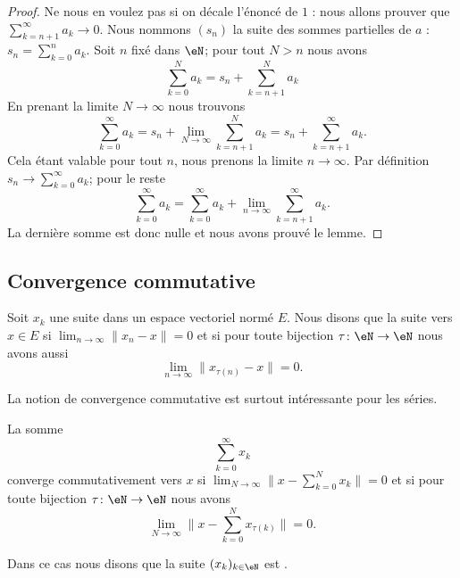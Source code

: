 \begin{proof}
	Ne nous en voulez pas si on décale l'énoncé de \( 1\) : nous allons prouver que \( \sum_{k=n+1}^{\infty}a_k\to 0\). Nous nommons \( (s_n)\) la suite des sommes partielles de \( a\) : \( s_n=\sum_{k=0}^na_k\). Soit \( n\) fixé dans \( \eN\); pour tout \( N>n\) nous avons
	\begin{equation}
		\sum_{k=0}^Na_k=s_n+\sum_{k=n+1}^Na_k
	\end{equation}
	En prenant la limite \( N\to \infty\) nous trouvons
	\begin{equation}
		\sum_{k=0}^{\infty}a_k=s_n+\lim_{N\to \infty} \sum_{k=n+1}^Na_k=s_n+\sum_{k=n+1}^{\infty}a_k.
	\end{equation}
	Cela étant valable pour tout \( n\), nous prenons la limite \( n\to\infty\). Par définition \( s_n\to\sum_{k=0}^{\infty}a_k\); pour le reste
	\begin{equation}
		\sum_{k=0}^{\infty}a_k=\sum_{k=0}^{\infty}a_k+\lim_{n\to \infty} \sum_{k=n+1}^{\infty}a_k.
	\end{equation}
	La dernière somme est donc nulle et nous avons prouvé le lemme.
\end{proof}


\subsection{Convergence commutative}

\begin{definition}      \label{DEFooORAGooZslkyS}
	Soit \( x_k\) une suite dans un espace vectoriel normé \( E\). Nous disons que la suite  vers \( x\in E\) si \( \lim_{n\to \infty}\| x_n-x \| =0\) et si pour toute bijection \( \tau\colon \eN\to \eN\) nous avons aussi
	\begin{equation}
		\lim_{n\to \infty} \| x_{\tau(n)}-x \|=0.
	\end{equation}
\end{definition}

La notion de convergence commutative est surtout intéressante pour les séries.

\begin{definition}\label{DEFooYMOHooMKzTSJ}
	La somme
	\begin{equation}
		\sum_{k=0}^{\infty}x_k
	\end{equation}
	converge commutativement vers \( x\) si \( \lim_{N\to \infty} \| x-\sum_{k=0}^Nx_k \|=0\) et si pour toute bijection \( \tau\colon \eN\to \eN\) nous avons
	\begin{equation}
		\lim_{N\to \infty} \| x-\sum_{k=0}^Nx_{\tau(k)} \|=0.
	\end{equation}

	Dans ce cas nous disons que la suite \( (x_k)_{k\in \eN}\) est .
\end{definition}

